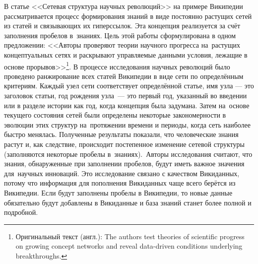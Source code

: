 В статье <<Сетевая структура научных революций>>\autocite{NetworkStructureRevolutions} 
на примере Википедии рассматривается процесс формирования знаний 
в виде постоянно растущих сетей из статей и связывающих их гиперссылок. 
Эта концепция реализуется за счёт заполнения пробелов в~знаниях. 
Цель этой работы сформулирована в одном предложении: 
<<Авторы проверяют теории научного прогресса на~растущих концептуальных сетях 
и раскрывают управляемые данными условия, лежащие в основе прорывов>>\footnote{%
%
Оригинальный текст (англ.):  The authors test theories of scientific progress 
    on growing concept networks and reveal data-driven conditions 
    underlying breakthroughs.}. 
В процессе исследования научных революций было проведено ранжирование всех статей Википедии 
в виде сети по определённым критериям. 
Каждый узел сети соответствует определённой статье, имя узла --- это заголовок статьи, 
год рождения узла~--- это первый год, указанный во введении или в разделе истории как год, когда концепция была задумана. 
Затем на~основе текущего состояния сетей были определены некоторые закономерности 
в эволюции этих структур на~протяжении времени и периоды, 
когда сеть наиболее быстро менялась. 
Полученные результаты показали, что человеческие знания растут и, как следствие, 
происходит постепенное изменение сетевой структуры (заполняются некоторые пробелы в~знаниях).\, 
Авторы исследования считают, что знания, 
обнаруженные при заполнении пробелов, будут иметь важное значения для~научных инноваций. 
Это исследование связано с качеством Викиданных, 
потому что информация для пополнения Викиданных чаще всего берётся из Википедии. 
Если будут заполнены пробелы в Википедии, 
то новые данные обязательно будут добавлены в Викиданные 
и база знаний станет более полной и подробной.

